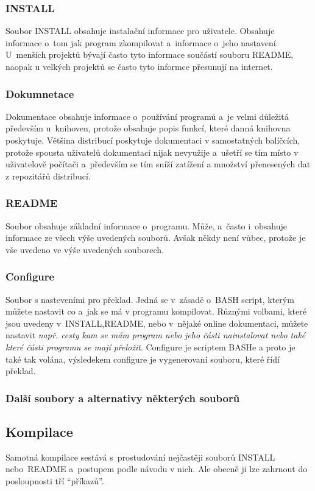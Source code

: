 \documentclass[a4paper,12pt]{article}
\renewcommand{\it}[1]{\textit{#1}}		%
\begin{document}
\subsubsection{INSTALL}
Soubor INSTALL obsahuje instalační informace pro uživatele. Obsahuje informace o~tom jak program zkompilovat a~informace o~jeho nastavení. U~menších projektů bývají často tyto informace součástí souboru README, naopak u velkých projektů se často tyto informce přesunují na internet.
\subsubsection{Dokumnetace}
Dokumentace obsahuje informace o~používání programů a~je velmi důležitá především u~knihoven, protože obsahuje popis funkcí, které danná knihovna poskytuje. Většina distribucí poskytuje dokumentaci v samostatných balíčcích, protože spousta uživatelů dokumentaci nijak nevyužije a~ušetří se tím místo v uživatelově počítači a~především se tím sníží zatížení a množství přenesených dat z repozitářů distribucí.
\subsubsection{README}
Soubor obsahuje základní informace o~programu. Může, a~často i~obsahuje informace ze všech výše uvedených souborů. Avšak někdy není vůbec, protože je vše uvedeno ve výše uvedených souborech.
\subsubsection{Configure}
Soubor s nasteveními pro překlad. Jedná se v~zásadě o~BASH script, kterým můžete nastavit co a~jak se má v programu kompilovat. Různými volbami, které jsou uvedeny v~INSTALL,README, nebo v~nějaké online dokumentaci, můžete nastavit \it{např. cesty kam se mám program nebo jeho části nainstalovat nebo také které části programu se mají přeložit}. Configure je scriptem BASHe a proto je také tak volána, výsledekem configure je vygenerovaní souboru, které řídí překlad.
\subsubsection{Další soubory a alternativy některých souborů}

\subsection{Kompilace}
Samotná kompilace sestává s~prostudování nejčastěji souborů INSTALL nebo README a~postupem podle návodu v nich. Ale obecně ji lze zahrnout do posloupnosti tří ``příkazů''.
\end{document}
